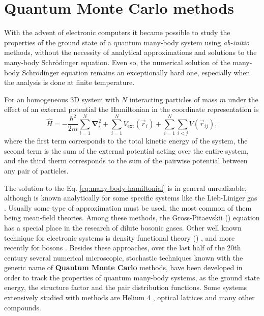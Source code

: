 
\chapter{Quantum Monte Carlo methods}
\label{chap:quantum-monte-carlo-methods}

With the advent of electronic computers it became possible to study the
properties of the ground state of a quantum many-body system using
\emph{ab-initio} methods, without the necessity of analytical approximations and
solutions to the many-body Schrödinger equation. Even so, the numerical solution
of the many-body Schrödinger equation remains an exceptionally hard one,
especially when the analysis is done at finite temperature.

For an homogeneous 3D system with $N$ interacting particles of mass $m$ under
the effect of an external potential the Hamiltonian in the coordinate
representation is
%
\begin{equation}
	\label{eq:many-body-hamiltonial}
	\hat H = -\frac{\hbar^2}{2m}\sum_{i=1}^{N} \mathbf{\nabla}^2_{i} +
	\sum_{i=1}^{N} V_{\mathrm{ext}}(\vec r_i) + \sum_{i=1}^{N} \sum_{i < j} V(\vec{r}_{ij}),
\end{equation}
%
where the first term corresponds to the total kinetic energy of the system, the
second term is the sum of the external potential acting over the entire system,
and the third therm corresponds to the sum of the pairwise potential between any
pair of particles.

The solution to the Eq. \eqref{eq:many-body-hamiltonial} is in general
unrealizable, although is known analytically for some specific systems like the
Lieb-Liniger gas \cite{bib:lieb-phys-rev.130.1605.1963}. Usually some type of
approximation must be used, the most common of them being mean-field theories.
Among these methods, the Gross-Pitaevskii (\GP) equation has a special place in
the research of dilute bosonic gases. Other well known technique for electronic
systems is density functional theory (\DFT)
\cite{bib:jones-rev-mod-phys.87.897.2015}, and more recently for bosons
\cite{bib:wang-phys-rev-A.88.023626.2013,
bib:malet-phys-rev-lett.115.033006.2015}. Besides these approaches, over the
last half of the 20th century several numerical microscopic, stochastic
techniques known with the generic name of \textbf{Quantum Monte Carlo} methods,
have been developed in order to track the properties of quantum many-body
systems, as the ground state energy, the structure factor and the pair
distribution functions. Some systems extensively studied with {\QMC} methods are
Helium 4 \cite{bib:boronat-phys-rev-B.49.8920.1994}, optical lattices
\cite{bib:astrakharchik-phys.rev.lett.95.190407.2005} and many other compounds.

